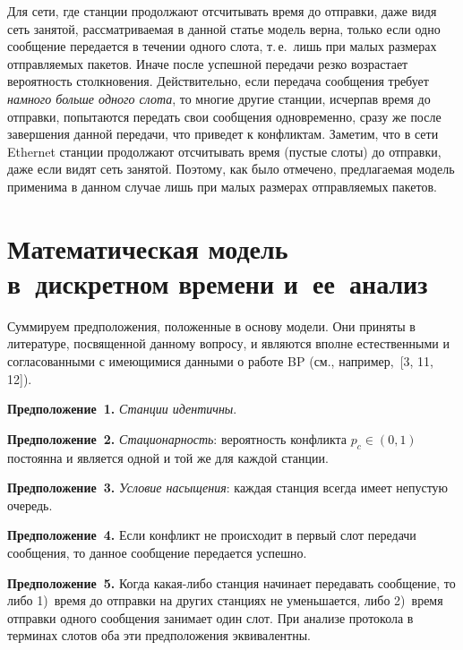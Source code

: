\begin{multicols}{2}


Для сети, где станции продолжают отсчитывать время до отправки, даже
видя сеть занятой,  рассматриваемая в данной статье модель верна,
только если одно сообщение  передается в  течении одного  слота, т.\,е.\ лишь при
 малых размерах  отправляемых пакетов. Иначе после
успешной передачи резко возрастает вероятность столкновения.
Действительно, если передача сообщения требует  {\it намного больше
одного  слота}, то многие другие станции, исчерпав время до отправки, попытаются
передать свои сообщения одновременно, сразу же  после завершения
данной передачи, что приведет к конфликтам.
 Заметим, что  в сети Ethernet станции продолжают отсчитывать время (пустые
слоты) до отправки, даже если  видят сеть занятой.  Поэтому, как
было отмечено, предлагаемая модель применима в данном случае    лишь
при малых размерах  отправляемых пакетов.

\section{Математическая модель в~дискретном времени  и~ее~анализ}

Суммируем предположения, положенные в основу модели. Они  приняты  в литературе, посвященной данному вопросу,
и являются вполне естественными и согласованными с имеющимися данными
о работе BP (см., например,~[3, 11, 12]).

\medskip

\noindent
\textbf{Предположение~1.} {\it Станции идентичны}.

\medskip

\noindent
\textbf{Предположение~2.}  {\it Стационарность}: вероятность конфликта
$p_c\in (0,1)$ постоянна  и является одной и той же для каждой
станции.

\medskip

\noindent
\textbf{Предположение~3.} {\it Условие насыщения}: каждая станция
всегда имеет непустую очередь.


\medskip

\noindent
\textbf{Предположение~4.} Если конфликт не происходит в первый слот
передачи сообщения, то  данное сообщение передается успешно.


\medskip

\noindent
\textbf{Предположение~5.} Когда какая-либо станция начинает передавать
сообщение, то  либо 1)~время до отправки на  других станциях не
уменьшается, либо 2)~время отправки одного сообщения занимает один
слот. При анализе протокола в терминах слотов оба эти предположения
эквивалентны.


\end{multicols}
